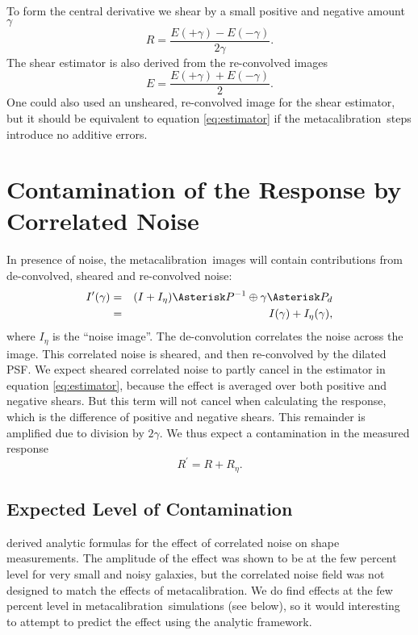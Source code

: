 \documentclass[usegraphicx,usenatbib]{mn2e}
\newcommand{\mcal}{metacalibration}
\begin{document}
To form the central derivative we shear by a small positive and negative
amount $\gamma$
\begin{equation} \label{eq:Rnum}
    R = \frac{E(+\gamma) - E(-\gamma)}{2 \gamma}.
\end{equation}
The shear estimator is also derived from the re-convolved
images
\begin{equation} \label{eq:estimator}
    E = \frac{E(+\gamma) + E(-\gamma)}{2}.
\end{equation}
One could also used an unsheared, re-convolved image for the
shear estimator, but it should be
equivalent to equation \ref{eq:estimator} if the \mcal\ steps
introduce no additive errors.

\section{Contamination of the Response by Correlated Noise} \label{sec:contam}

In presence of noise, the \mcal\ images will contain
contributions from de-convolved, sheared and re-convolved noise:
\begin{eqnarray}
    I^{\prime}(\gamma) & = & (I + I_\eta) \Asterisk P^{-1} \oplus \gamma \Asterisk P_{d} \nonumber \\
    & = & I(\gamma) + I_\eta(\gamma),
\end{eqnarray}
where $I_\eta$ is the ``noise image''.  The de-convolution correlates the noise
across the image.  This correlated noise is sheared, and then re-convolved by
the dilated PSF.  We expect sheared correlated noise to partly cancel in the
estimator in equation \ref{eq:estimator}, because the effect is
averaged over both positive and negative shears.  But this term will not cancel
when calculating the response, which is the difference of positive and negative
shears.  This remainder is amplified due to division by $2 \gamma$.
We thus expect a contamination in the measured response
\begin{equation}
    R^{\prime}  =  R + R_{\eta}.
\end{equation}

\subsection{Expected Level of Contamination}

\cite{HirataCorrNoise} derived analytic formulas for the effect of correlated
noise on shape measurements.  The amplitude of the effect was shown to be at
the few percent level for very small and noisy galaxies, but the correlated
noise field was not designed to match the effects of \mcal.  We do find effects
at the few percent level in \mcal\ simulations (see below), so it would
interesting to attempt to predict the effect using the analytic framework.
\end{document}

